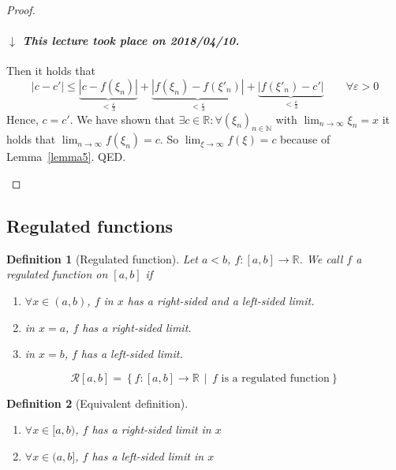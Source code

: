 \documentclass{article}
\newtheorem{definition}{Definition}  \numberwithin{definition}{section}
\newcommand{\setdef}[2]{\left\{\left.#1\,\middle|\,#2\right.\right\}}
\newcommand{\card}[1]{\left|#1\right|}
\newcommand{\dateref}[1]{%
  \begin{mdframed}[backgroundcolor=gray!10,innerbottommargin=0pt,innertopmargin=0pt]
    \paragraph{\textit{$\downarrow$ This lecture took place on #1.}}%
  \end{mdframed}%
}
\begin{document}
\begin{proof}
\begin{description}
      \dateref{2018/04/10}

      Then it holds that
      \[ \card{c - c'} \leq \underbrace{\card{c - f(\xi_n)}}_{< \frac\varepsilon3} + \underbrace{\card{f(\xi_n) - f(\xi'_n)}}_{< \frac\varepsilon3} + \underbrace{\card{f(\xi'_n) - c'}}_{< \frac\varepsilon3} \qquad \forall \varepsilon > 0 \]
      Hence, $c = c'$.
      We have shown that $\exists c \in \mathbb R: \forall (\xi_n)_{n \in \mathbb N}$ with $\lim_{n\to\infty} \xi_n = x$ it holds that
      $\lim_{n\to\infty} f(\xi_n) = c$. So $\lim_{\xi\to\infty} f(\xi) = c$ because of Lemma~\ref{lemma5}. QED.
  \end{description}
\end{proof}

\subsection{Regulated functions}

\begin{definition}[Regulated function] %
  Let $a < b$, $f: [a,b] \to \mathbb R$. We call $f$ a \emph{regulated function on $[a,b]$} if
  \begin{enumerate}
    \item $\forall x \in (a,b)$, $f$ in $x$ has a right-sided and a left-sided limit.
    \item in $x = a$, $f$ has a right-sided limit.
    \item in $x = b$, $f$ has a left-sided limit.
  \end{enumerate}

  \[ \mathcal R[a,b] = \setdef{f: [a,b] \to \mathbb R}{f \text{ is a regulated function}} \]
\end{definition}

\begin{definition}[Equivalent definition]
  \begin{enumerate}
    \item $\forall x \in [a,b)$, $f$ has a right-sided limit in $x$
    \item $\forall x \in (a,b]$, $f$ has a left-sided limit in $x$
  \end{enumerate}
\end{definition}
\end{document}
